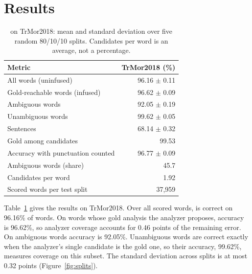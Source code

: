 \section{Results}
\label{sec:results}

\begin{table}[t]
\centering
\small
\begin{tabular}{@{}lr@{}}
\toprule
Metric & TrMor2018 (\%) \\
\midrule
All words (uninfused) & 96.16 $\pm$ 0.11 \\
Gold-reachable words (infused) & 96.62 $\pm$ 0.09 \\
Ambiguous words & 92.05 $\pm$ 0.19 \\
Unambiguous words & 99.62 $\pm$ 0.05 \\
Sentences & 68.14 $\pm$ 0.32 \\
\midrule
Gold among candidates & 99.53 \\
Accuracy with punctuation counted & 96.77 $\pm$ 0.09 \\
Ambiguous words (share) & 45.7 \\
Candidates per word & 1.92 \\
Scored words per test split & 37,959 \\
\bottomrule
\end{tabular}
\caption{\savyar{} on TrMor2018: mean and standard deviation over five random 80/10/10 splits. Candidates per word is an average, not a percentage.}
\label{tab:main}
\end{table}

Table~\ref{tab:main} gives the results on TrMor2018. Over all scored words, \savyar{} is correct on 96.16\% of words. On words whose gold analysis the analyzer proposes, accuracy is 96.62\%, so analyzer coverage accounts for 0.46 points of the remaining error. On ambiguous words accuracy is 92.05\%. Unambiguous words are correct exactly when the analyzer's single candidate is the gold one, so their accuracy, 99.62\%, measures coverage on this subset. The standard deviation across splits is at most 0.32 points (Figure~\ref{fig:splits}).




